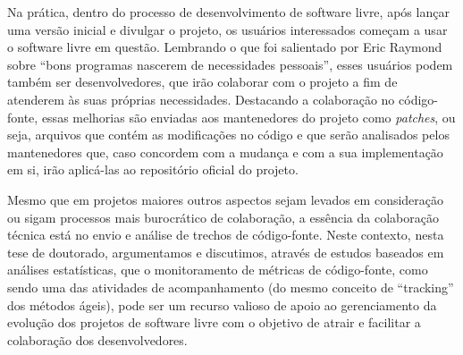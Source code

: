 Na prática, dentro do processo de desenvolvimento de software livre, após lançar
uma versão inicial e divulgar o projeto, os usuários interessados começam a
usar o software livre em questão. 
%
Lembrando o que foi salientado por Eric Raymond sobre ``bons programas nascerem de
necessidades pessoais'', esses usuários podem também ser desenvolvedores, que
irão colaborar com o projeto a fim de atenderem às suas próprias necessidades.
%
Destacando a colaboração no código-fonte, essas melhorias são enviadas aos
mantenedores do projeto como \emph{patches}, ou seja, arquivos que
contém as modificações no código e que serão analisados pelos mantenedores que,
caso concordem com a mudança e com a sua implementação em si, irão
aplicá-las ao repositório oficial do projeto.

Mesmo que em projetos maiores outros aspectos sejam levados em consideração ou
sigam processos mais burocrático de colaboração, a essência da colaboração
técnica está no envio e análise de trechos de código-fonte.
%
Neste contexto, nesta tese de doutorado, argumentamos e discutimos, através de
estudos baseados em análises estatísticas, que o monitoramento de métricas de
código-fonte, como sendo uma das atividades de acompanhamento (do mesmo conceito de
``tracking'' dos métodos ágeis), pode ser um recurso  valioso de apoio
ao gerenciamento da evolução dos projetos de software livre com o objetivo de
atrair e facilitar a colaboração dos desenvolvedores.

